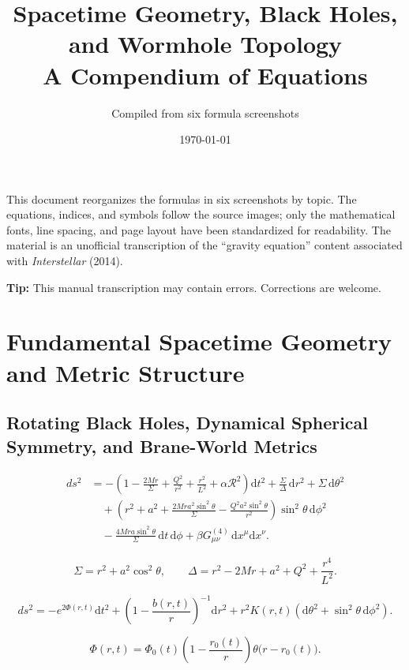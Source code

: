 \documentclass[11pt,a4paper]{article}
\title{\bfseries Spacetime Geometry, Black Holes, and Wormhole Topology\\[0.35em]
\large A Compendium of Equations}
\author{Compiled from six formula screenshots}
\date{\today}
\newcommand{\R}{\mathcal{R}}
\newcommand{\dd}{\mathrm{d}}
\begin{document}
\maketitle
\thispagestyle{empty}

\begin{center}
\parbox{0.88\linewidth}{\small
This document reorganizes the formulas in six screenshots by topic. The equations,
indices, and symbols follow the source images; only the mathematical fonts, line
spacing, and page layout have been standardized for readability. The material is an
unofficial transcription of the ``gravity equation'' content associated with
\emph{Interstellar} (2014).

\smallskip
\noindent\textcolor{deepred}{\bfseries Tip:} This manual transcription may contain errors. Corrections are welcome.
}
\end{center}

\vspace{0.5em}

\section{Fundamental Spacetime Geometry and Metric Structure}

\subsection{Rotating Black Holes, Dynamical Spherical Symmetry, and Brane-World Metrics}

\begin{align*}
ds^2
&=-\left(1-\frac{2Mr}{\Sigma}+\frac{Q^2}{r^2}+\frac{r^2}{L^2}+\alpha\R^2\right)\dd t^2
  +\frac{\Sigma}{\Delta}\,\dd r^2+\Sigma\,\dd\theta^2\\
&\quad+\left(r^2+a^2+\frac{2Mra^2\sin^2\theta}{\Sigma}
  -\frac{Q^2a^2\sin^2\theta}{r^2}\right)\sin^2\theta\,\dd\phi^2\\
&\quad-\frac{4Mra\sin^2\theta}{\Sigma}\,\dd t\,\dd\phi
  +\beta G^{(4)}_{\mu\nu}\,\dd x^\mu\dd x^\nu .
\end{align*}

\[
\Sigma=r^2+a^2\cos^2\theta,\qquad
\Delta=r^2-2Mr+a^2+Q^2+\frac{r^4}{L^2}.
\]

\[
ds^2=-e^{2\Phi(r,t)}\dd t^2
+\left(1-\frac{b(r,t)}{r}\right)^{-1}\dd r^2
+r^2K(r,t)\left(\dd\theta^2+\sin^2\theta\,\dd\phi^2\right).
\]

\[
\Phi(r,t)=\Phi_0(t)\left(1-\frac{r_0(t)}{r}\right)\theta\bigl(r-r_0(t)\bigr).
\]
\end{document}
